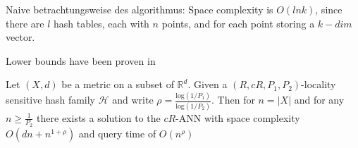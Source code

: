 Naive betrachtungsweise des algorithmus:
Space complexity is $O(lnk)$, since there are $l$ hash tables, each with $n$ points, and for each point storing a $k-dim$ vector.

Lower bounds have been proven in \cite{motwani2006lower}

\begin{theorem}
    Let $(X,d)$ be a metric on a subset of $\mathbb{R}^d$. Given a $(R, cR, P_1, P_2)$-locality sensitive hash family $\mathcal{H}$ and write $\rho = \frac{\text{log}(1/P_1)}{\text{log}(1/P_2)}$. Then for $n = |X|$ and for any $n \geq \frac{1}{P_2}$ there exists a solution to the $cR$-ANN with space complexity $O(dn+n^{1+\rho})$ and query time of $O(n^{\rho})$
\end{theorem}







